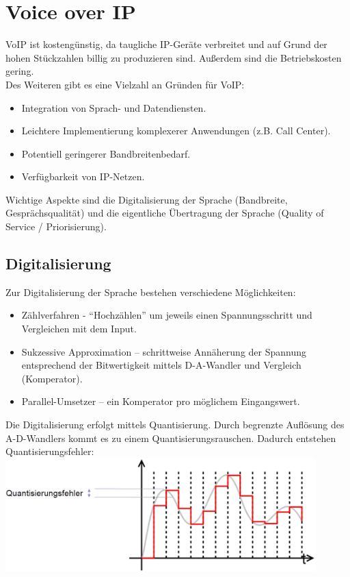 \documentclass{article} %
\begin{document}
\section{Voice over IP}
VoIP ist kostengünstig, da taugliche IP-Geräte verbreitet und auf Grund der hohen Stückzahlen billig zu produzieren sind. Außerdem sind die Betriebskosten gering.\\
Des Weiteren gibt es eine Vielzahl an Gründen für VoIP: 
\begin{itemize}
	\item Integration von Sprach- und Datendiensten.
	\item Leichtere Implementierung komplexerer Anwendungen	(z.B. Call Center).
	\item Potentiell geringerer Bandbreitenbedarf.
	\item Verfügbarkeit von IP-Netzen.
\end{itemize}
Wichtige Aspekte sind die Digitalisierung der Sprache (Bandbreite, Gesprächsqualität) und die eigentliche Übertragung der Sprache (Quality of Service / Priorisierung).
\subsection{Digitalisierung}
Zur Digitalisierung der Sprache bestehen verschiedene Möglichkeiten:
\begin{itemize}
	\item Zählverfahren - "`Hochzählen"' um jeweils einen Spannungsschritt und Vergleichen mit dem Input.
	\item Sukzessive Approximation – schrittweise Annäherung der Spannung entsprechend der Bitwertigkeit mittels D-A-Wandler	und Vergleich (Komperator).
	\item Parallel-Umsetzer – ein Komperator pro möglichem	Eingangswert.	
\end{itemize}
Die Digitalisierung erfolgt mittels Quantisierung. Durch begrenzte Auflösung des A-D-Wandlers kommt es zu einem Quantisierungsrauschen. Dadurch entstehen Quantisierungsfehler:\\
\includegraphics[width=12cm]{img/quantisierungsfehler.png}
\end{document}

